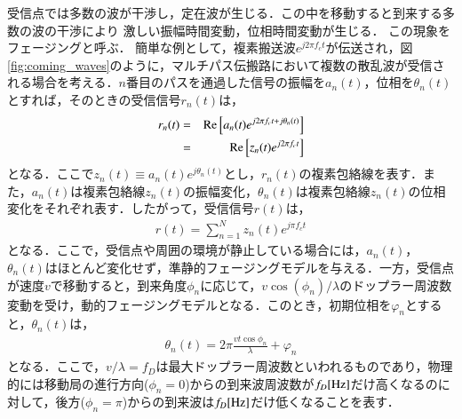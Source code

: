 受信点では多数の波が干渉し，定在波が生じる．この中を移動すると到来する多数の波の干渉により
激しい振幅時間変動，位相時間変動が生じる．
この現象をフェージングと呼ぶ\cite{okumura}．
簡単な例として，複素搬送波$e^{j2\pi f_ct}$が伝送され，図 \ref{fig:coming_waves}のように，マルチパス伝搬路において複数の散乱波が受信される場合を考える．$n$番目のパスを通過した信号の振幅を$a_n(t)$，位相を$\theta_n(t)$とすれば，そのときの受信信号$r_n(t)$は，
\begin{eqnarray}
r_n(t)&=&{\rm Re}\left[a_n(t)e^{j2\pi f_c t+j\theta_n(t)}\right]\nonumber \\
&=&{\rm Re}\left[z_n(t)e^{j2\pi f_c t}\right]
\end{eqnarray}
となる．ここで$z_n(t)\equiv a_n(t)e^{j\theta_n(t)}$とし，$r_n(t)$の複素包絡線を表す．また，$a_n(t)$は複素包絡線$z_n(t)$の振幅変化，$\theta_n(t)$は複素包絡線$z_n(t)$の位相変化をそれぞれ表す．したがって，受信信号$r(t)$は，
\begin{eqnarray}
r(t)=\sum_{n=1}^{N}z_n(t)e^{j\pi f_ct}
\end{eqnarray}
となる．ここで，受信点や周囲の環境が静止している場合には，$a_n(t)$，$\theta_n(t)$はほとんど変化せず，準静的フェージングモデルを与える．一方，受信点が速度$v$で移動すると，到来角度$\phi_n$に応じて，$v\cos(\phi_n)/\lambda$のドップラー周波数変動を受け，動的フェージングモデルとなる．このとき，初期位相を$\varphi_n$とすると，$\theta_n(t)$は，
\begin{eqnarray}
\theta_n(t)=2\pi\frac{vt\cos\phi_n}{\lambda}+\varphi_n
\end{eqnarray}
となる．ここで，$v/\lambda=f_D$は最大ドップラー周波数といわれるものであり，物理的には移動局の進行方向($\phi_n=0$)からの到来波周波数が$f_D[{\rm Hz}]$だけ高くなるのに対して，後方($\phi_n=\pi$)からの到来波は$f_D[{\rm Hz}]$だけ低くなることを表す．
